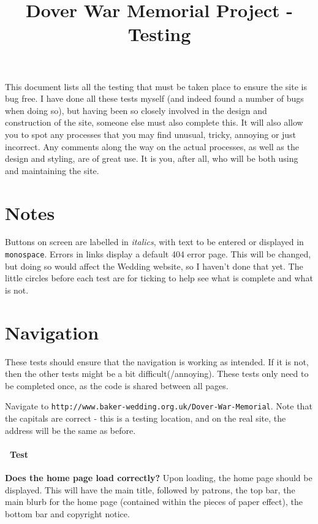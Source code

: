 \documentclass[12pt]{article}
\title{\textbf{Dover War Memorial Project - Testing}}
\date{}
\author{}
\newcounter{Test}
\newcommand{\test}[1]{%
\stepcounter{Test}%
\paragraph{\Circle\ Test \theTest} \textbf{#1} }
\begin{document}
\maketitle

This document lists all the testing that must be taken place to ensure the site is bug free. I have done all these tests myself (and indeed found a number of bugs when doing so), but having been so closely involved in the design and construction of the site, someone else must also complete this. It will also allow you to spot any processes that you may find unusual, tricky, annoying or just incorrect. Any comments along the way on the actual processes, as well as the design and styling, are of great use. It is you, after all, who will be both using and maintaining the site. \smiley

\tableofcontents
\newpage


\section{Notes}
Buttons on screen are labelled in \textit{italics}, with text to be entered or displayed in \texttt{monospace}. Errors in links display a default 404 error page. This will be changed, but doing so would affect the Wedding website, so I haven't done that yet. The little circles before each test are for ticking to help see what is complete and what is not.

\section{Navigation}

These tests should ensure that the navigation is working as intended. If it is not, then the other tests might be a bit difficult(/annoying). These tests only need to be completed once, as the code is shared between all pages.

Navigate to \texttt{http://www.baker-wedding.org.uk/Dover-War-Memorial}. Note that the capitals are correct - this is a testing location, and on the real site, the address will be the same as before.
\test {Does the home page load correctly?}
Upon loading, the home page should be displayed. This will have the main title, followed by patrons, the top bar, the main blurb for the home page (contained within the pieces of paper effect), the bottom bar and copyright notice.
\end{document}
